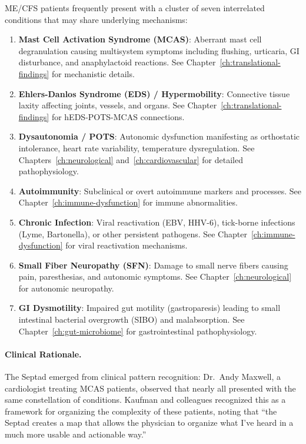 \begin{hypothesis}
\label{hyp:septad}
ME/CFS patients frequently present with a cluster of seven interrelated conditions that may share underlying mechanisms:

\begin{enumerate}
    \item \textbf{Mast Cell Activation Syndrome (MCAS)}: Aberrant mast cell degranulation causing multisystem symptoms including flushing, urticaria, GI disturbance, and anaphylactoid reactions. See Chapter~\ref{ch:translational-findings} for mechanistic details.
    \item \textbf{Ehlers-Danlos Syndrome (EDS) / Hypermobility}: Connective tissue laxity affecting joints, vessels, and organs. See Chapter~\ref{ch:translational-findings} for hEDS-POTS-MCAS connections.
    \item \textbf{Dysautonomia / POTS}: Autonomic dysfunction manifesting as orthostatic intolerance, heart rate variability, temperature dysregulation. See Chapters~\ref{ch:neurological} and~\ref{ch:cardiovascular} for detailed pathophysiology.
    \item \textbf{Autoimmunity}: Subclinical or overt autoimmune markers and processes. See Chapter~\ref{ch:immune-dysfunction} for immune abnormalities.
    \item \textbf{Chronic Infection}: Viral reactivation (EBV, HHV-6), tick-borne infections (Lyme, Bartonella), or other persistent pathogens. See Chapter~\ref{ch:immune-dysfunction} for viral reactivation mechanisms.
    \item \textbf{Small Fiber Neuropathy (SFN)}: Damage to small nerve fibers causing pain, paresthesias, and autonomic symptoms. See Chapter~\ref{ch:neurological} for autonomic neuropathy.
    \item \textbf{GI Dysmotility}: Impaired gut motility (gastroparesis) leading to small intestinal bacterial overgrowth (SIBO) and malabsorption. See Chapter~\ref{ch:gut-microbiome} for gastrointestinal pathophysiology.
\end{enumerate}
\end{hypothesis}

\paragraph{Clinical Rationale.}
The Septad emerged from clinical pattern recognition: Dr.\ Andy Maxwell, a cardiologist treating MCAS patients, observed that nearly all presented with the same constellation of conditions. Kaufman and colleagues recognized this as a framework for organizing the complexity of these patients, noting that ``the Septad creates a map that allows the physician to organize what I've heard in a much more usable and actionable way.''

